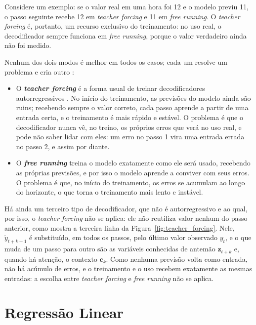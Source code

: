 Considere um exemplo: se o valor real em uma hora foi 12 e o modelo previu 11, o passo seguinte recebe 12 em \textit{teacher forcing} e 11 em \textit{free running}. O \textit{teacher forcing} é, portanto, um recurso exclusivo do treinamento: no uso real, o decodificador sempre funciona em \textit{free running}, porque o valor verdadeiro ainda não foi medido.

Nenhum dos dois modos é melhor em todos os casos; cada um resolve um problema e cria outro \cite{bengio2015scheduled}:

\begin{itemize}
    \item O \textbf{\textit{teacher forcing}} é a forma usual de treinar decodificadores autorregressivos \cite{sutskever2014sequence}. No início do treinamento, as previsões do modelo ainda são ruins; recebendo sempre o valor correto, cada passo aprende a partir de uma entrada certa, e o treinamento é mais rápido e estável. O problema é que o decodificador nunca vê, no treino, os próprios erros que verá no uso real, e pode não saber lidar com eles: um erro no passo 1 vira uma entrada errada no passo 2, e assim por diante.
    \item O \textbf{\textit{free running}} treina o modelo exatamente como ele será usado, recebendo as próprias previsões, e por isso o modelo aprende a conviver com seus erros. O problema é que, no início do treinamento, os erros se acumulam ao longo do horizonte, o que torna o treinamento mais lento e instável.
\end{itemize}

Há ainda um terceiro tipo de decodificador, que não é autorregressivo e ao qual, por isso, o \textit{teacher forcing} não se aplica: ele não reutiliza valor nenhum do passo anterior, como mostra a terceira linha da Figura~\ref{fig:teacher_forcing}. Nele, \(\tilde{y}_{t+k-1}\) é substituído, em todos os passos, pelo último valor observado \(y_t\), e o que muda de um passo para outro são as variáveis conhecidas de antemão \(\mathbf{z}_{t+k}\) e, quando há atenção, o contexto \(\mathbf{c}_k\). Como nenhuma previsão volta como entrada, não há acúmulo de erros, e o treinamento e o uso recebem exatamente as mesmas entradas: a escolha entre \textit{teacher forcing} e \textit{free running} não se aplica.

\section{Regressão Linear}
\label{sec:regressao_linear}

